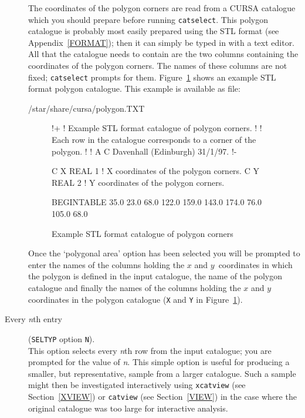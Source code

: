 \documentclass[twoside,11pt]{starlink}
\begin{document}
\begin{description}
   The coordinates of the polygon corners are read from a CURSA
   catalogue which you should prepare before running \texttt{catselect}.
   This polygon catalogue is probably most easily prepared using the
   STL format (see Appendix~\ref{FORMAT}); then it can simply be typed in
   with a text editor.
   All that the catalogue needs to contain are the two columns
   containing the coordinates of the polygon corners.  The names of
   these columns are not fixed; \texttt{catselect} prompts for them.
   Figure~\ref{POLY} shows an example STL format polygon catalogue.
   This example is available as file:

  \begin{terminalv}
/star/share/cursa/polygon.TXT
  \end{terminalv}

  \begin{figure}[htbp]

  \begin{terminalv}
!+
! Example STL format catalogue of polygon corners.
!
! Each row in the catalogue corresponds to a corner of the polygon.
!
! A C Davenhall (Edinburgh) 31/1/97.
!-

C X REAL 1  ! X coordinates of the polygon corners.
C Y REAL 2  ! Y coordinates of the polygon corners.

BEGINTABLE
 35.0   23.0
 68.0  122.0
159.0  143.0
174.0   76.0
105.0   68.0
  \end{terminalv}

  \caption{Example STL format catalogue of polygon corners
  \label{POLY} }

  \end{figure}

   Once the `polygonal area' option has been selected you will be
   prompted to enter the names of the columns holding the $x$\/ and
   $y$\, coordinates in which the polygon is defined in the input
   catalogue, the name of the polygon catalogue and finally the names
   of the columns holding the $x$\/ and $y$\/ coordinates in the polygon
   catalogue (\texttt{X} and \texttt{Y} in Figure~\ref{POLY}).

  \item[Every \textit{n}th entry] (\texttt{SELTYP} option \texttt{N}). \\
   This option selects every \textit{n}th row from the input catalogue; you
   are prompted for the value of \textit{n}.  This simple option is useful
   for producing a smaller, but representative, sample from a larger
   catalogue.  Such a sample might then be investigated interactively using
   \texttt{xcatview} (see Section~\ref{XVIEW}) or \texttt{catview} (see
   Section~\ref{VIEW}) in the case where the original catalogue was too
   large for interactive analysis.

\end{description}
\end{document}
